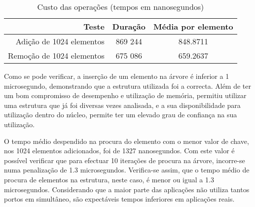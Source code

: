 \begin{table}
\begin{center}
\caption{Custo das operações (tempos em nanosegundos)}
\begin{tabular}{ | r | c | c | }
\hline
\hspace{1cm} Teste \hspace{1.5cm} & \hspace{1cm}Duração\hspace{1cm} &  Média por
elemento \\
\hline
Adição de 1024 elementos & 869 244 & 848.8711 \\
\hline
Remoção de 1024 elementos & 675 086 & 659.2637\\
\hline

\hline
\end{tabular}
\label{tab:tree_info}
\end{center}
\end{table}

Como se pode verificar, a inserção de um elemento na árvore é inferior a 1 microsegundo, demonstrando que a estrutura utilizada foi a correcta.
 Além de ter um bom compromisso de desempenho e utilização de memória, permitiu utilizar uma estrutura que já foi diversas vezes analisada, e a sua disponibilidade para utilização dentro do núcleo, permite ter um elevado grau de confiança na sua utilização.

O tempo médio despendido na procura do elemento com o menor valor de chave, nos 1024 elementos adicionados, foi de 1327 nanosegundos.
 Com este valor é possível verificar que para efectuar 10 iterações de procura na árvore, incorre-se numa penalização de 1.3 microsegundos. 
 Verifica-se assim, que o tempo médio de procura de elementos na estrutura, neste caso, é menor ou igual a 1.3 microsegundos.
 Considerando que a maior parte das aplicações não utiliza tantos portos em simultâneo, são expectáveis tempos inferiores em aplicações reais.

